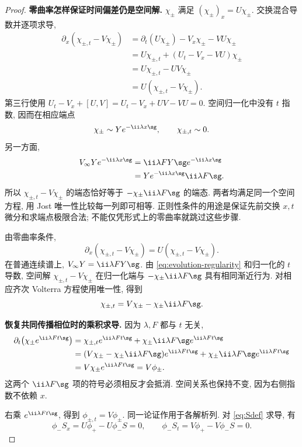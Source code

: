 \begin{proof}

\par\medskip\noindent\textbf{零曲率怎样保证时间偏差仍是空间解.}\quad 
$\chi_\pm$ 满足 $(\chi_\pm)_x=U\chi_\pm$.
交换混合导数并逐项求导,
\begin{align*}
\partial_x(\chi_{\pm,t}-V\chi_\pm)
&=\partial_t(U\chi_\pm)-V_x\chi_\pm-VU\chi_\pm\\
&=U\chi_{\pm,t}+(U_t-V_x-VU)\chi_\pm\\
&=U\chi_{\pm,t}-UV\chi_\pm\\
&=U(\chi_{\pm,t}-V\chi_\pm).
\end{align*}
第三行使用
$U_t-V_x+[U,V]=U_t-V_x+UV-VU=0$.
空间归一化中没有 $t$ 指数, 因而在相应端点
\[
\chi_\pm\sim Ye^{-\ii\lambda x\sg},
\qquad
\chi_{\pm,t}\sim0.
\]
另一方面,
\begin{align*}
V_\infty Ye^{-\ii\lambda x\sg}
&=\ii\lambda F Y\sg e^{-\ii\lambda x\sg}\\
&=Ye^{-\ii\lambda x\sg}\ii\lambda F\sg.
\end{align*}
所以 $\chi_{\pm,t}-V\chi_\pm$ 的端态恰好等于
$-\chi_\pm\ii\lambda F\sg$ 的端态.
两者均满足同一个空间方程, 用 Jost 唯一性比较每一列即可相等.
正则性条件的用途是保证先前交换 $x,t$ 微分和求端点极限合法;
不能仅凭形式上的零曲率就跳过这些步骤.

由零曲率条件,
\[
\partial_x(\chi_{\pm,t}-V\chi_\pm)=U(\chi_{\pm,t}-V\chi_\pm).
\]
在普通连续谱上, $V_\infty Y=\ii\lambda F Y\sg$. 由 \eqref{eq:evolution-regularity} 和归一化的 $t$ 导数, 空间解 $\chi_{\pm,t}-V\chi_\pm$ 在归一化端与 $-\chi_\pm\ii\lambda F\sg$ 具有相同渐近行为. 对相应齐次 Volterra 方程使用唯一性, 得到
\[
\chi_{\pm,t}=V\chi_\pm-\chi_\pm\ii\lambda F\sg.
\]

\par\medskip\noindent\textbf{恢复共同传播相位时的乘积求导.}\quad 
因为 $\lambda,F$ 都与 $t$ 无关,
\begin{align*}
\partial_t\bigl(\chi_\pm e^{\ii\lambda Ft\sg}\bigr)
&=\chi_{\pm,t}e^{\ii\lambda Ft\sg}
+\chi_\pm\ii\lambda F\sg e^{\ii\lambda Ft\sg}\\
&=(V\chi_\pm-\chi_\pm\ii\lambda F\sg)e^{\ii\lambda Ft\sg}
+\chi_\pm\ii\lambda F\sg e^{\ii\lambda Ft\sg}\\
&=V\chi_\pm e^{\ii\lambda Ft\sg}=V\phi_\pm.
\end{align*}
这两个 $\ii\lambda F\sg$ 项的符号必须相反才会抵消.
空间关系也保持不变, 因为右侧指数不依赖 $x$.

右乘 $e^{\ii\lambda Ft\sg}$, 得到 $\phi_{\pm,t}=V\phi_\pm$. 同一论证作用于各解析列. 对 \eqref{eq:Sdef} 求导, 有
\[
\phi_-S_x=U\phi_+-U\phi_-S=0,\qquad
\phi_-S_t=V\phi_+-V\phi_-S=0.
\]


\end{proof}
